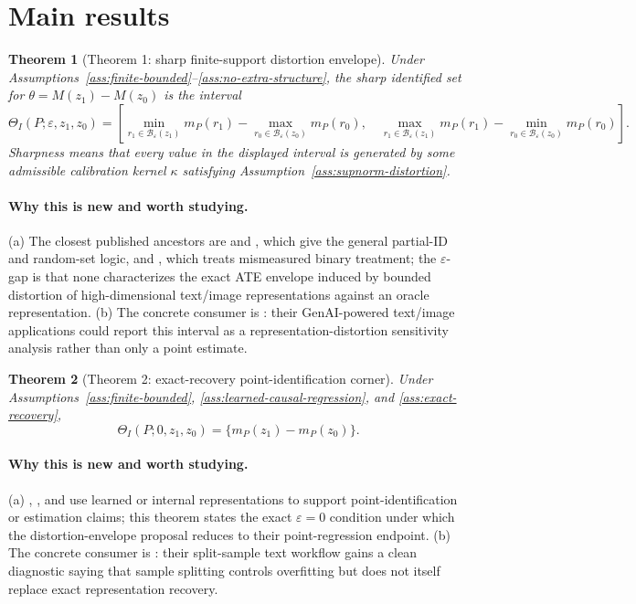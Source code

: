 \documentclass[11pt]{article}
\theoremstyle{definition}
\theoremstyle{plain}
\newtheorem{theorem}{Theorem}
\theoremstyle{remark}
\begin{document}
\section{Main results}
\begin{theorem}[Theorem 1: sharp finite-support distortion envelope]\label{thm:sharp-envelope}
Under Assumptions~\ref{ass:finite-bounded}--\ref{ass:no-extra-structure}, the sharp identified set for \(\theta=M(z_1)-M(z_0)\) is the interval
\[
\Theta_I(P;\varepsilon,z_1,z_0)
=\left[
\min_{r_1\in\mathcal B_\varepsilon(z_1)}m_P(r_1)
-\max_{r_0\in\mathcal B_\varepsilon(z_0)}m_P(r_0),\quad
\max_{r_1\in\mathcal B_\varepsilon(z_1)}m_P(r_1)
-\min_{r_0\in\mathcal B_\varepsilon(z_0)}m_P(r_0)
\right].
\]
Sharpness means that every value in the displayed interval is generated by some admissible calibration kernel \(\kappa\) satisfying Assumption~\ref{ass:supnorm-distortion}.
\end{theorem}

\paragraph{Why this is new and worth studying.}
(a) The closest published ancestors are \citet{Manski1990} and \citet{BeresteanuMolchanovMolinari2012}, which give the general partial-ID and random-set logic, and \citet{Ura2018}, which treats mismeasured binary treatment; the \(\varepsilon\)-gap is that none characterizes the exact ATE envelope induced by bounded distortion of high-dimensional text/image representations against an oracle representation. (b) The concrete consumer is \citet{ImaiNakamura2025GPI}: their GenAI-powered text/image applications could report this interval as a representation-distortion sensitivity analysis rather than only a point estimate.

\begin{theorem}[Theorem 2: exact-recovery point-identification corner]\label{thm:exact-corner}
Under Assumptions~\ref{ass:finite-bounded}, \ref{ass:learned-causal-regression}, and \ref{ass:exact-recovery},
\[
\Theta_I(P;0,z_1,z_0)=\{m_P(z_1)-m_P(z_0)\}.
\]
\end{theorem}

\paragraph{Why this is new and worth studying.}
(a) \citet{VeitchSridharBlei2020}, \citet{KaddourZhuLiuKusnerSilva2021}, and \citet{ImaiNakamura2024TextTreatments} use learned or internal representations to support point-identification or estimation claims; this theorem states the exact \(\varepsilon=0\) condition under which the distortion-envelope proposal reduces to their point-regression endpoint. (b) The concrete consumer is \citet{EgamiFongGrimmerRobertsStewart2022}: their split-sample text workflow gains a clean diagnostic saying that sample splitting controls overfitting but does not itself replace exact representation recovery.
\end{document}
